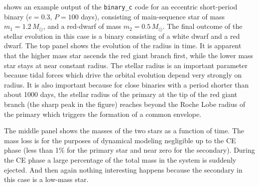 \documentclass[ twoside,openright,titlepage,numbers=noenddot,headinclude,%
                footinclude=true,cleardoublepage=empty,abstractoff, %
                BCOR=5mm,paper=a4,fontsize=11pt,%
                american,%
                ]{scrreprt}
\begin{document}
 shows an example output of the \texttt{binary\_c} code
for an eccentric short-period binary ($e=0.3$, $P=100$ days), consisting of 
main-sequence star of mass  
$m_1=1.2\,M_\odot$, and a red-dwarf of mass $m_2=0.5\,M_\odot$. 
The final outcome of the stellar evolution in this case is a binary 
consisting of a white dwarf and a red dwarf.
The top panel shows the evolution of the radius in time. It is apparent that 
the higher mass star ascends the red giant branch first, while the lower mass
star stays at near constant radius. The stellar radius is an important parameter
because tidal forces which drive the orbital evolution depend very strongly on 
radius. It is also important because for close binaries with a period shorter
than about 1000 days, the stellar radius of the primary at the tip of the 
red giant branch (the sharp peak in the figure) reaches beyond the Roche
Lobe radius of the primary which triggers the formation of a common envelope. 

The middle panel shows the masses of the two stars as a function of time.
The mass loss is for the purposes of dynamical modeling negligible up to 
the CE phase (less than 1\% for the primary star and near zero for the 
secondary). During the CE phase a large percentage of the total mass in 
the system is suddenly ejected. And then again nothing interesting
happens because the secondary in this case is a low-mass star.
\end{document}
